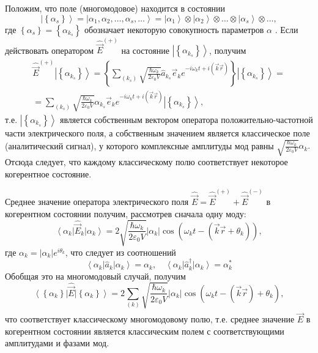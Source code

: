 Положим, что поле (многомодовое) находится в состоянии
\[
\left| \left\{\alpha_s\right\}\right> = 
\left| \alpha_1, \alpha_2, \dots, \alpha_s, \dots\right> = 
\left| \alpha_1\right>
\otimes
\left| \alpha_2\right>
\otimes
\dots
\otimes
\left| \alpha_s\right>
\otimes
\dots,
\]
где $\left\{\alpha_s\right\}= \left\{\alpha_{k_s}\right\}$
обозначает некоторую совокупность параметров $\alpha$ . Если действовать
оператором $\hat{\vec{E}}^{(+)}$ на состояние  $\left|\left\{\alpha_{k_s}\right\}\right>$,  получим 
\begin{eqnarray}
\hat{\vec{E}}^{(+)}\left|\left\{\alpha_{k_s}\right\}\right> = 
\left\{ \sum_{(k_s)} \sqrt{\frac{\hbar \omega_k}{2 \varepsilon_0
V}} \hat{a}_{k_s} \vec{e}_k e^{-i \omega_k t + i \left(\vec{k}\vec{r}
  \right)}\right\}\left|\left\{\alpha_{k_s}\right\}\right> = 
\nonumber \\
= 
\sum_{(k_s)} \sqrt{\frac{\hbar \omega_k}{2 \varepsilon_0
V}} \alpha_{k_s} \vec{e}_k e^{-i \omega_k t + i \left(\vec{k}\vec{r}
  \right)}\left|\left\{\alpha_{k_s}\right\}\right>,
\end{eqnarray}
т.е. $\left|\left\{\alpha_{k_s}\right\}\right>$  является собственным
вектором оператора положительно-частотной части электрического поля, а
собственным значением является классическое поле (аналитический
сигнал), у которого комплексные амплитуды мод равны  
\(
\sqrt{\frac{\hbar \omega_k}{2 \varepsilon_0
V}} \alpha_k.
\)
Отсюда следует, что каждому классическому полю соответствует некоторое
когерентное состояние. 

Среднее значение оператора электрического поля $\hat{\vec{E}} =
\hat{\vec{E}}^{(+)} + \hat{\vec{E}}^{(-)}$   в когерентном
состоянии получим, рассмотрев сначала одну моду: 
\[
\left<\alpha_{k}\right|\hat{\vec{E}}_k\left|\alpha_{k}\right> = 2
\sqrt{\frac{\hbar \omega_k}{2 \varepsilon_0
V}}\left|\alpha_{k}\right|\cos 
\left(\omega_k t - \left(\vec{k} \vec{r} + \theta_k\right) \right),
\]
где $\alpha_k = \left|\alpha_{k}\right| e^{i \theta_k}$, что следует из соотношений
\[
\left<\alpha_k\right|\hat{a}_k\left|\alpha_k\right> = \alpha_k, \quad
\left<\alpha_k\right|\hat{a}^{\dag}_k\left|\alpha_k\right> = \alpha^{*}_k
\]
Обобщая это на многомодовый случай, получим
\begin{equation}
\left<\left\{\alpha_{k}\right\}\right|\hat{\vec{E}}\left|\left\{\alpha_{k}\right\}\right>
= 2 \sum_{(k)} \sqrt{\frac{\hbar \omega_k}{2 \varepsilon_0
V}} \left|\alpha_k\right|\cos \left(\omega_k t -
\left(\vec{k}\vec{r}\right) + \theta_k \right),
\end{equation}
что соответствует классическому многомодовому полю, т.е. среднее
значение $\hat{\vec{E}}$   в когерентном состоянии является
классическим полем с соответствующими амплитудами и фазами мод. 

